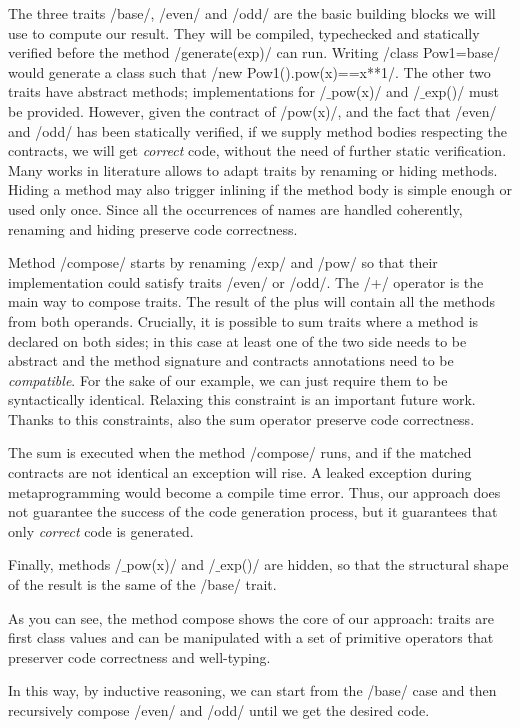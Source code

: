 The three traits /base/, /even/ and /odd/ are the basic building blocks we will use to compute our result. They will be compiled, typechecked and statically verified before the method /generate(exp)/ can run.
Writing /class Pow1=base/ would generate a class such that /new Pow1().pow(x)==x**1/.
The other two traits have abstract methods; implementations for /$\_$pow(x)/ and /$\_$exp()/ must be provided. However, given the contract of /pow(x)/,
and the fact that /even/ and /odd/ has been statically verified,
if we supply method bodies respecting the contracts, we will get \emph{correct} code, without the need of further static verification.
Many works in literature allows to adapt traits by renaming or hiding methods. Hiding a method may also trigger inlining if the method body is simple enough or used only once.
Since all the occurrences of names are handled coherently, renaming and hiding preserve code correctness.

Method /compose/ starts by renaming /exp/ and /pow/
so that their implementation could satisfy traits 
/even/ or /odd/.
The /+/ operator is the main way to compose traits.
The result of the plus will contain all the methods from both operands.
Crucially, it is possible to sum traits where a method is declared on both sides; in this case at least one of the two side needs to be abstract and the method signature and contracts annotations need to be \emph{compatible}.
For the sake of our example, we can just require them to be syntactically identical. Relaxing this constraint is an important future work.
Thanks to this constraints, also the sum operator preserve code correctness.

The sum is executed when the method /compose/ runs, and if the matched contracts are not identical an exception will rise. A leaked exception during metaprogramming would become a compile time error.
Thus, our approach does not guarantee the success of the code generation process, but it guarantees that only \emph{correct} code is generated.

Finally, methods /$\_$pow(x)/ and /$\_$exp()/ are hidden, so that the structural shape of the result is
the same of the /base/ trait.

As you can see, the method compose shows the core of our approach: traits are first class values and can be manipulated with a set of primitive operators that preserver code correctness and well-typing.

In this way, by inductive reasoning, we can start from the /base/ case and then recursively compose /even/ and /odd/ until we get the desired code.

